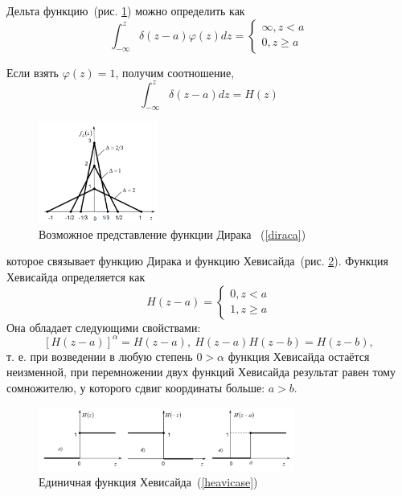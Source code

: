 \documentclass[12pt, a4paper]{article}
\begin{document}
Дельта функцию~(рис. \ref{dirac}) можно определить как 
\begin{equation}
	\label{diraca}
	\int_{-\infty}^z \delta (z - a) \varphi (z) dz = 
		\begin{cases}
			\infty, z < a \\
			0, z \geqslant a	
		\end{cases}
\end{equation}

Если взять $\varphi (z) = 1$, получим соотношение, 
\begin{equation}
	\label{heavi}
	\int_{-\infty}^z \delta (z - a) dz = 
	H(z)
\end{equation}

\begin{figure}[!h]
	\centering
	\includegraphics[width=0.35\textwidth]{dirac}%
	\caption{Возможное представление функции Дирака ~(\ref{diraca})}
	\vspace*{-2mm}
	\label{dirac}
\end{figure}

которое связывает функцию Дирака и функцию Хевисайда~(рис. \ref{heavi}).
Функция Хевисайда определяется как
\begin{equation}
	\label{heavicase}
	H(z - a) = 
	\begin{cases}
		0, z < a \\
		1, z \geqslant a	
	\end{cases}
\end{equation}
Она обладает следующими свойствами:
\begin{equation}
	\label{heavicase}
	[H(z - a)]^\alpha = H(z - a),~
	H(z - a) H(z - b) = H(z - b),	
\end{equation}
т. е. при возведении в любую степень $0 > \alpha$ функция Хевисайда остаётся
неизменной, при перемножении двух функций Хевисайда результат равен
тому сомножителю, у которого сдвиг координаты больше: $a > b$.

\begin{figure}[!h]
	\centering
	\includegraphics[width=0.75\textwidth]{heavi}%
	\caption{Единичная функция Хевисайда~(\ref{heavicase})}
	\vspace*{-2mm}
	\label{heavi}
\end{figure}
\end{document}
